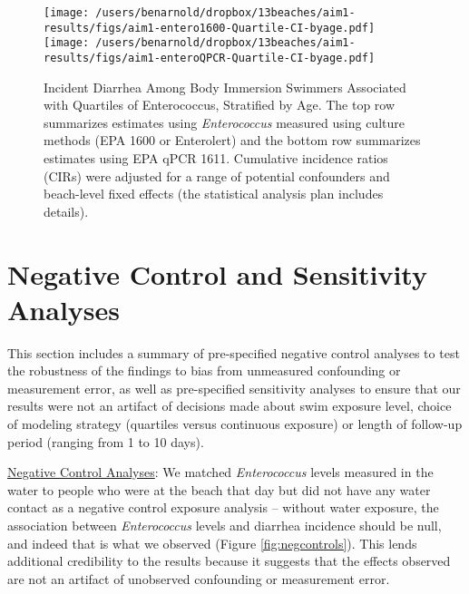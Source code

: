 \documentclass[12pt]{article}\usepackage[]{graphicx}\usepackage[]{color}
\begin{document}
\begin{landscape}
\begin{figure}
\begin{center}
\texttt{[image: /users/benarnold/dropbox/13beaches/aim1-results/figs/aim1-entero1600-Quartile-CI-byage.pdf]} \\
\texttt{[image: /users/benarnold/dropbox/13beaches/aim1-results/figs/aim1-enteroQPCR-Quartile-CI-byage.pdf]}
\caption{Incident Diarrhea Among Body Immersion Swimmers Associated with Quartiles of Enterococcus, Stratified by Age. The top row summarizes estimates using \textit{Enterococcus} measured using culture methods (EPA 1600 or Enterolert) and the bottom row summarizes estimates using EPA qPCR 1611.  Cumulative incidence ratios (CIRs) were adjusted for a range of potential confounders and beach-level fixed effects (the statistical analysis plan includes details).   \label{fig:enteroage}}
\end{center}
\end{figure}
\end{landscape}



\clearpage
\section{Negative Control and Sensitivity Analyses}

This section includes a summary of pre-specified negative control analyses to test the robustness of the findings to bias from unmeasured confounding or measurement error, as well as pre-specified sensitivity analyses to ensure that our results were not an artifact of decisions made about swim exposure level, choice of modeling strategy (quartiles versus continuous exposure) or length of follow-up period (ranging from 1 to 10 days).

\bigskip
\underline{Negative Control Analyses}: We matched \emph{Enterococcus} levels measured in the water to people who were at the beach that day but did not have any water contact as a negative control exposure analysis\supercite{Lipsitch2010-kq,Colford2012-um} -- without water exposure, the association between \emph{Enterococcus} levels and diarrhea incidence should be null, and indeed that is what we observed (Figure \ref{fig:negcontrols}). This lends additional credibility to the results because it suggests that the effects observed are not an artifact of unobserved confounding or measurement error.\supercite{Lipsitch2010-kq}
\end{document}
